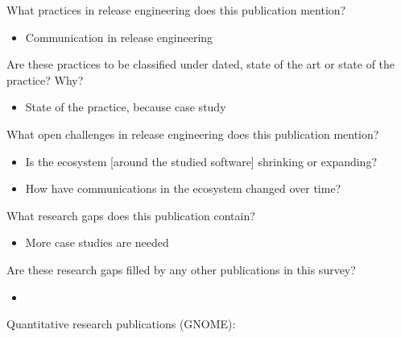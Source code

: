 \documentclass[]{book}
\providecommand{\tightlist}{%
  \setlength{\itemsep}{0pt}\setlength{\parskip}{0pt}}
\begin{document}
What practices in release engineering does this publication mention?

\begin{itemize}
\tightlist
\item
  Communication in release engineering
\end{itemize}

Are these practices to be classified under dated, state of the art or
state of the practice? Why?

\begin{itemize}
\tightlist
\item
  State of the practice, because case study
\end{itemize}

What open challenges in release engineering does this publication
mention?

\begin{itemize}
\tightlist
\item
  Is the ecosystem {[}around the studied software{]} shrinking or
  expanding?
\item
  How have communications in the ecosystem changed over time?
\end{itemize}

What research gaps does this publication contain?

\begin{itemize}
\tightlist
\item
  More case studies are needed
\end{itemize}

Are these research gaps filled by any other publications in this survey?

\begin{itemize}
\item
\end{itemize}

Quantitative research publications (GNOME):
\end{document}
